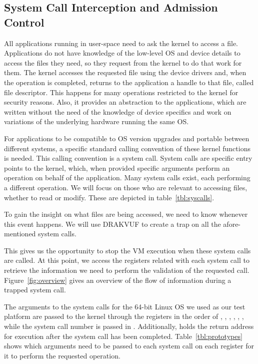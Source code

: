 \subsection{System Call Interception and Admission Control}\label{sub:syscalls}


\par All applications running in user-space need to ask the kernel to access a file. Applications do not have knowledge of the low-level \ac{OS} and device details to access the files they need, so they request from the kernel to do that work for them. The kernel accesses the requested file using the device drivers and, when the operation is completed, returns to the application a handle to that file, called file descriptor. This happens for many operations restricted to the kernel for security reasons. Also, it provides an abstraction to the applications, which are written without the need of the knowledge of device specifics and work on variations of the underlying hardware running the same \ac{OS}. 

\par For applications to be compatible to \ac{OS} version upgrades and portable between different systems, a specific standard calling convention of these kernel functions is needed. This calling convention is a system call. System calls are specific entry points to the kernel, which, when provided specific arguments perform an operation on behalf of the application. Many system calls exist, each performing a different operation. We will focus on those who are relevant to accessing files, whether to read or modify. These are depicted in table~\ref{tbl:syscalls}.

\par To gain the insight on what files are being accessed, we need to know whenever this event happens. We will use DRAKVUF to create a trap on all the afore-mentioned system calls.

\par This gives us the opportunity to stop the \ac{VM} execution when these system calls are called. At this point, we access the registers related with each system call to retrieve the information we need to perform the validation of the requested call. Figure~\ref{fig:overview} gives an overview of the flow of information during a trapped system call. 

\par The arguments to the system calls for the 64-bit Linux \ac{OS} we used as our test platform are passed to the kernel through the registers in the order of , , , , , , while the system call number is passed in . Additionally,  holds the return address for execution after the system call has been completed. Table~\ref{tbl:prototypes} shows which arguments need to be passed to each system call on each register for it to perform the requested operation.

